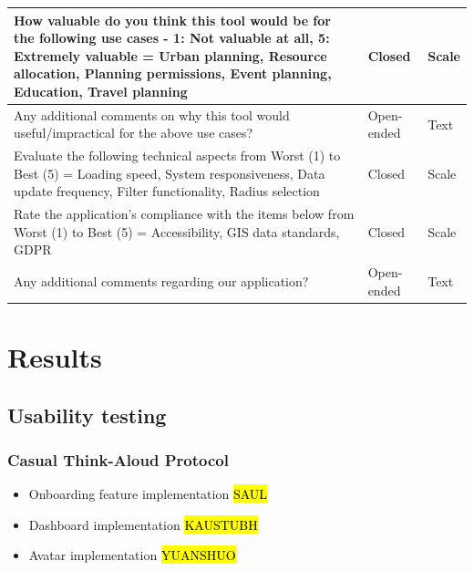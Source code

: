 \documentclass{report}
\begin{document}
\begin{table}[h!]
\begin{tabularx}{\textwidth}{|p{}|X|X|}
        How valuable do you think this tool would be for the following use cases - 1: Not valuable at all, 5: Extremely valuable = Urban planning, Resource allocation, Planning permissions, Event planning, Education, Travel planning & Closed                 & Scale                \\ \hline
        Any additional comments on why this tool would useful/impractical for the above use cases?                                                                                                                                       & Open-ended             & Text                 \\ \hline
        Evaluate the following technical aspects from Worst (1) to Best (5) = Loading speed, System responsiveness, Data update frequency, Filter functionality, Radius selection                                                        & Closed                 & Scale                \\ \hline
        Rate the application's compliance with the items below from Worst (1) to Best (5) = Accessibility, GIS data standards, GDPR                                                                                                      & Closed                 & Scale                \\ \hline
        Any additional comments regarding our application?                                                                                                                                                                               & Open-ended             & Text
    \end{tabularx}
\end{table}

\chapter{Results}
\section{Usability testing}
\subsection{Casual Think-Aloud Protocol}
\begin{itemize}
    \item Onboarding feature implementation \hl{SAUL}
    \item Dashboard implementation \hl{KAUSTUBH}
    \item Avatar implementation \hl{YUANSHUO}
\end{itemize}
\end{document}
